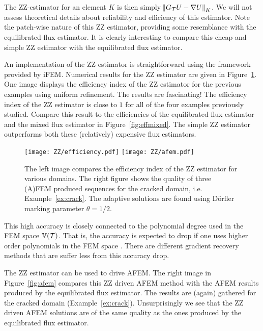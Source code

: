 \documentclass[thesis.tex]{subfiles}
\begin{document}
The ZZ-estimator for an element $K$ is then simply $\norm{G_{\mathcal{T}} U - \nabla U}_K$. We will
not assess theoretical details about reliability and efficiency of this estimator. Note the patch-wise nature of this ZZ estimator,
providing some resemblance with the equilibrated flux estimator.
It is clearly interesting to compare this cheap and simple ZZ estimator with the equilibrated flux estimator.

An implementation of the ZZ estimator is straightforward using the framework provided by iFEM. 
Numerical results for the ZZ estimator are given in Figure~\ref{fig:ZZ}.
One image displays the efficiency index of the ZZ estimator for the previous examples using uniform refinement.
The results are fascinating! The efficiency index of the ZZ estimator is close to $1$ for all of the four examples previously
studied. Compare this result to the efficiencies of the equilibrated flux estimator and the mixed flux estimator in Figure~\ref{fig:effmixed}.
The simple ZZ estimator outperforms both these (relatively) expensive flux estimators. 

\begin{figure}
  \centering
  \texttt{[image: ZZ/efficiency.pdf]}
  \texttt{[image: ZZ/afem.pdf]}
  \caption{
    The left image compares the efficiency index of the ZZ estimator for various domains.
    The right figure shows the quality of three (A)FEM produced sequences for the cracked domain, i.e. Example~\ref{ex:crack}. The adaptive solutions are found using D\"orfler marking parameter $\theta = 1/2$.
  }
  \label{fig:ZZ}
\end{figure}

This high accuracy is closely
connected to the polynomial degree used in the FEM space $\mathbb{V}(\mathcal{T})$. That is, the accuracy
is expected to drop if one uses higher order polynomials in the FEM space \cite{bartels2002each}.
There are different gradient recovery methods that are suffer less from this accuracy drop.

The ZZ estimator can be used to drive AFEM. The right image in Figure~\ref{fig:afem} compares this ZZ driven AFEM method
with the AFEM results produced by the equilibrated flux estimator. The results are (again) gathered for the cracked domain 
(Example~\ref{ex:crack}). Unsurprisingly we see that the ZZ driven AFEM solutions are of the same quality as the ones produced by the
equilibrated flux estimator. 
\end{document}

